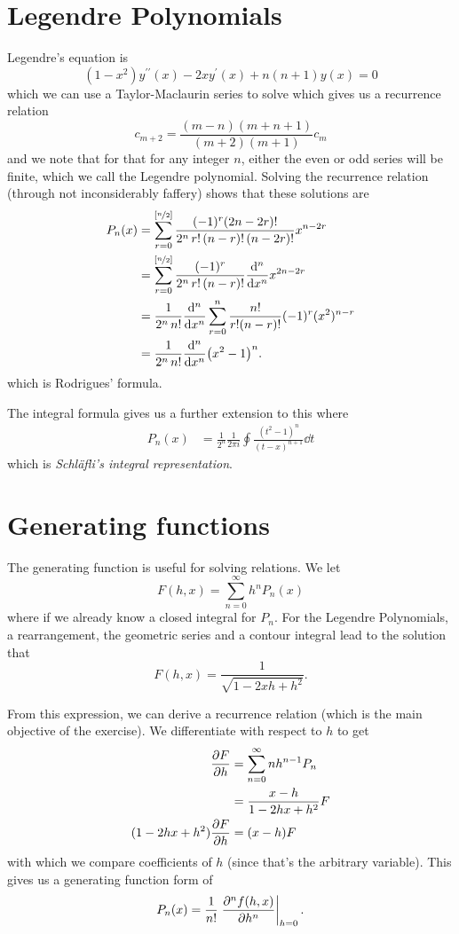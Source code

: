 \documentclass[a4paper,12pt,parskip=full,BCOR=1cm]{scrreprt}
\begin{document}
\section{Legendre Polynomials}
Legendre's equation is
\begin{equation*}
 (1-x^2)y^{\prime\prime}(x) - 2xy^{\prime}(x) + n(n+1)y(x)=0
\end{equation*}
which we can use a Taylor-Maclaurin series to solve which gives us a recurrence relation
\begin{equation*}
 c_{m+2} = \frac{(m-n)(m+n+1)}{(m+2)(m+1)}c_m
\end{equation*}
and we note that for that for any integer $n$, either the even or odd series will be finite, which we call the Legendre polynomial.
Solving the recurrence relation (through not inconsiderably faffery) shows that these solutions are
\begin{align*}
 P_n(x) & = \sum_{r=0}^{\left[\nicefrac{n}{2}\right]}\frac{(-1)^r(2n-2r)!}{2^n \,r!\, (n-r)!\, (n-2r)!}x^{n-2r} \\
        & = \sum_{r=0}^{\left[\nicefrac{n}{2}\right]} \frac{(-1)^r}{2^n\,r!\,(n-r)!}\dv[n]{x}x^{2n-2r}          \\
        & = \frac{1}{2^n\,n!}\dv[n]{x}\sum_{r=0}^{n}\frac{n!}{r!(n-r)!}(-1)^r(x^2)^{n-r}                         \\
        & = \frac{1}{2^n\,n!}\dv[n]{x} (x^2 -1)^n.
\end{align*}
which is Rodrigues' formula.

The integral formula gives us a further extension to this where
\begin{align*}
 P_n(x) & = \frac{1}{2^n}\frac{1}{2\pi i}\oint\frac{(t^2-1)^n}{(t-x)^{n+1}}\dd{t}
\end{align*}
which is \emph{Schl\"afli's integral representation}.

\section{Generating functions}
The generating function is useful for solving relations.
We let
$$F(h, x) = \sum^\infty_{n=0} h^n P_n(x)$$ where if we already know a closed integral for $P_n$.
For the Legendre Polynomials, a rearrangement, the geometric series and a contour integral lead to the solution that
$$F(h, x) = \frac{1}{\sqrt{1-2xh+h^2}}.$$

From this expression, we can derive a recurrence relation (which is the main objective of the exercise).
We differentiate with respect to $h$ to get
\begin{align*}
 \pdv{F}{h}            & = \sum_{n=0}^{\infty} nh^{n-1}P_n \\
                       & = \frac{x-h}{1-2hx+h^2}F          \\
 (1-2hx+h^2)\pdv{F}{h} & = (x-h)F
\end{align*}
with which we compare coefficients of $h$ (since that's the arbitrary variable).
This gives us a generating function form of
$$ P_n(x) = \frac{1}{n!} \eval{\pdv[n]{f(h,x)}{h}}_{h=0}. $$
\end{document}
